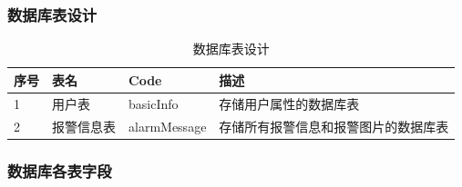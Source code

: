 \documentclass[article]{BJTU-thesis}
\begin{document}
\subsubsection{数据库表设计}

\begin{table}[!htbp]
	\centering
	\caption{数据库表设计}
	\label{tab:my-table}
	\begin{tabular}{|l|l|l|l|}
		\hline
		序号 & 表名    & Code         & 描述                 \\ \hline
		1  & 用户表   & basicInfo    & 存储用户属性的数据库表        \\ \hline
		2  & 报警信息表 & alarmMessage & 存储所有报警信息和报警图片的数据库表 \\ \hline
	\end{tabular}
\end{table}

\subsubsection{数据库各表字段}
\end{document}
